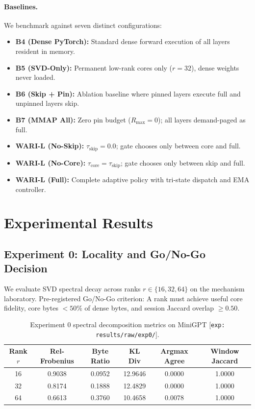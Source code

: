 \documentclass[11pt,a4paper]{article}
\begin{document}
\paragraph{Baselines.}
We benchmark against seven distinct configurations:
\begin{itemize}
    \item \textbf{B4 (Dense PyTorch):} Standard dense forward execution of all layers resident in memory.
    \item \textbf{B5 (SVD-Only):} Permanent low-rank cores only ($r=32$), dense weights never loaded.
    \item \textbf{B6 (Skip + Pin):} Ablation baseline where pinned layers execute full and unpinned layers skip.
    \item \textbf{B7 (MMAP All):} Zero pin budget ($R_{\max}=0$); all layers demand-paged as full.
    \item \textbf{WARI-L (No-Skip):} $\tau_{\text{skip}} = 0.0$; gate chooses only between core and full.
    \item \textbf{WARI-L (No-Core):} $\tau_{\text{core}} = \tau_{\text{skip}}$; gate chooses only between skip and full.
    \item \textbf{WARI-L (Full):} Complete adaptive policy with tri-state dispatch and EMA controller.
\end{itemize}

\section{Experimental Results}

\subsection{Experiment 0: Locality and Go/No-Go Decision}
We evaluate SVD spectral decay across ranks $r \in \{16, 32, 64\}$ on the mechanism laboratory. 
Pre-registered Go/No-Go criterion: A rank must achieve useful core fidelity, core bytes $< 50\%$ of dense bytes, and session Jaccard overlap $\ge 0.50$.

\begin{table}[htbp]
\centering
\small
\begin{tabular}{cccccc}
\toprule
\textbf{Rank $r$} & \textbf{Rel-Frobenius} & \textbf{Byte Ratio} & \textbf{KL Div} & \textbf{Argmax Agree} & \textbf{Window Jaccard} \\
\midrule
16 & 0.9038 & 0.0952 & 12.9646 & 0.0000 & 1.0000 \\
32 & 0.8174 & 0.1888 & 12.4829 & 0.0000 & 1.0000 \\
64 & 0.6613 & 0.3760 & 10.4658 & 0.0078 & 1.0000 \\
\bottomrule
\end{tabular}
\caption{Experiment 0 spectral decomposition metrics on MiniGPT [\texttt{exp: results/raw/exp0/}].}
\label{tab:exp0}
\end{table}
\end{document}
